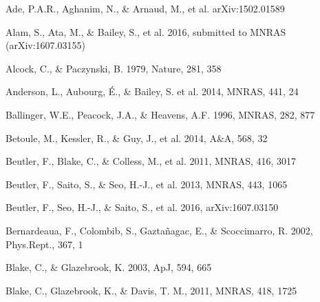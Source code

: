 \documentclass[iop]{emulateapj}
\begin{document}

\begin{thebibliography}{}

Ade, P.A.R., Aghanim, N., \& Arnaud, M., et al. arXiv:1502.01589

Alam, S., Ata, M., \& Bailey, S., et al. 2016,
submitted to MNRAS (arXiv:1607.03155)


Alcock, C., \& Paczynski, B. 1979, Nature, 281, 358  


Anderson, L., Aubourg, \'E., \& Bailey, S. et al. 2014, MNRAS, 441, 24  
  

Ballinger, W.E., Peacock, J.A., \& Heavens, A.F. 1996, MNRAS, 282, 877  

Betoule, M., Kessler, R., \& Guy, J., et al. 2014, A\&A, 568, 32


Beutler, F., Blake, C., \& Colless, M., et al. 2011, MNRAS, 416, 3017

Beutler, F., Saito, S., \& Seo, H.-J., et al. 2013, MNRAS, 443, 1065

Beutler, F., Seo, H.-J., \& Saito, S., et al. 2016,
arXiv:1607.03150

Bernardeaua, F., Colombib, S., Gaztañagac, E., \& Scoccimarro, R. 
2002, Phys.Rept., 367, 1

Blake, C., \& Glazebrook, K. 2003, ApJ, 594, 665


Blake, C., Glazebrook, K., \& Davis, T. M., 2011, MNRAS, 418, 1725  


\end{thebibliography}
\end{document}
